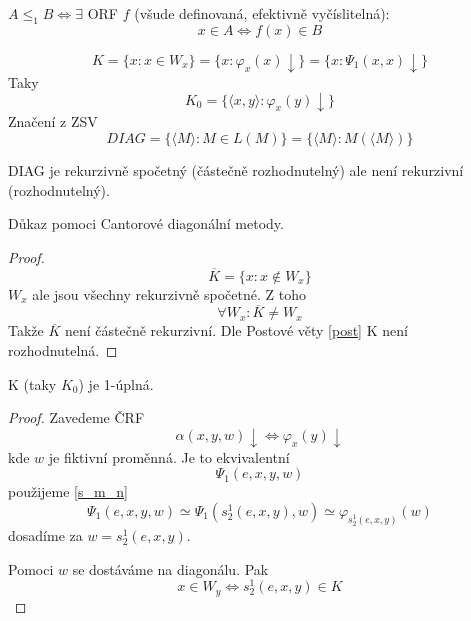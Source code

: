 \begin{definition}
	$A \leq_1 B \iff \exists$ ORF $f$ (všude definovaná, efektivně vyčíslitelná):
	\[ x \in A \iff f(x) \in B \]
\end{definition}

\begin{notation}
	\[ K = \{ x: x \in W_x \} = \{ x: \varphi_x(x) \downarrow \} = \{ x: \Psi_1(x, x) \downarrow \} \]
	Taky
	\[ K_0 = \{ \langle x, y \rangle: \varphi_x(y) \downarrow \} \]
	Značení z ZSV
	\[ DIAG = \{ \langle M \rangle: M \in L(M) \} = \{ \langle M \rangle: M(\langle M \rangle) \} \]
\end{notation}

\begin{note}
	DIAG je rekurzivně spočetný (částečně rozhodnutelný) ale není rekurzivní (rozhodnutelný).

	Důkaz pomoci Cantorové diagonální metody.
\end{note}
\begin{proof}
	\[ \overline{K} = \{ x: x \notin W_x \} \]
	$W_x$ ale jsou všechny rekurzivně spočetné.
	Z toho
	\[ \forall W_x: \overline{K} \neq W_x \]
	Takže $\overline{K}$ není částečně rekurzivní.
	Dle Postové věty \cref{post} K není rozhodnutelná.
\end{proof}

\begin{theorem}[K 1-complete]
	K (taky $K_0$) je 1-úplná.
\end{theorem}
\begin{proof}
	Zavedeme ČRF
	\[ \alpha(x, y, w) \downarrow \iff \varphi_x(y) \downarrow\]
	kde $w$ je fiktivní proměnná.
	Je to ekvivalentní
	\[ \Psi_1(e, x, y, w) \]
	použijeme \cref{s_m_n}
	\[ \Psi_1(e, x, y, w) \simeq \Psi_1(s_2^1(e, x, y), w) \simeq \varphi_{s_2^1(e, x, y)}(w) \]
	dosadíme za $w = s_2^1(e, x, y)$.

	Pomoci $w$ se dostáváme na diagonálu. Pak
	\[ x \in W_y \iff s_2^1(e, x, y) \in K \]
\end{proof}

